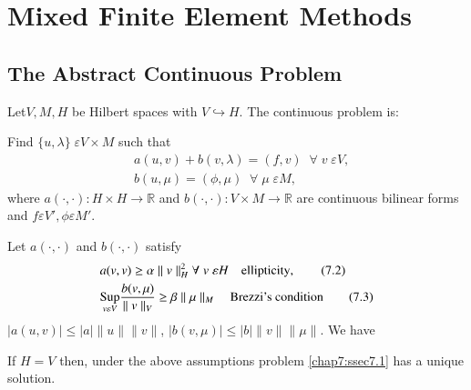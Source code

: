 
\chapter{Mixed Finite Element Methods}\label{chap7}

\section{The Abstract Continuous Problem}\label{chap7:ssec7.1}
Let\pageoriginale $V,M,H$ be Hilbert spaces with $V\hookrightarrow
H$. The continuous problem is:   

Find $\{u,\lambda\}\;\varepsilon V\times M$ such that 
\begin{align*}
&a(u,v)+b(v,\lambda) = (f,v)\; \; \forall \; v\; \varepsilon
V,\tag{7.1}\label{chap7:eq7.1} \\
&b(u,\mu) = (\phi,\mu)\; \; \forall \;\mu \; \varepsilon
M,\tag{7.1b}\label{chap7:eq7.1b} 
\end{align*} 
where $a(\cdotp,\cdotp):H\times H\to\mathbb{R}$ and
$b(\cdotp,\cdotp):V\times M\to\mathbb{R}$ are continuous bilinear
forms and $f\varepsilon V', \phi\varepsilon M'$. 

Let $a(\cdotp,\cdotp)$ and $b(\cdotp,\cdotp)$ satisfy
\begin{align*}
&a(v,v)\geq\alpha\parallel v\parallel_H^2\forall \; v \;\varepsilon H
\quad\text{ellipticity},\tag{7.2}\label{chap7:eq7.2}\\
&\underset{v\varepsilon V}{\operatorname{Sup}}\frac{b(v,\mu)} {\parallel v\parallel_V}
\geq \beta\parallel\mu\parallel_M\quad \text{Brezzi's
condition}\tag{7.3} \label{chap7:eq7.3} 
\end{align*}
$|a(u,v)|\leq |a|\parallel u\parallel \parallel v\parallel$,
$|b(v,\mu)|\leq |b|\parallel v\parallel \parallel \mu\parallel$. We
have 

\setcounter{THM}{0}
\begin{THM}\label{chap7:THM1}
If $H=V$ then, under the above assumptions problem
\eqref{chap7:ssec7.1} has a unique solution.
\end{THM}

